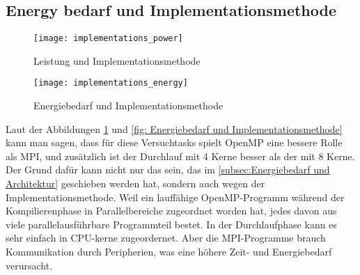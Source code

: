 \subsection{Energy bedarf und Implementationsmethode}
\label{subsec:Energy bedarf und Implementationsmethode}

\begin{figure}[ht]
\texttt{[image: implementations\_power]}
\caption[Leistung und Implementationsmethode]{Leistung und Implementationsmethode}
\label{fig:Leistung und Implementationsmethode}
\end{figure}

\begin{figure}[ht]
\texttt{[image: implementations\_energy]}
\caption[Energiebedarf und Implementationsmethode]{Energiebedarf und Implementationsmethode}
\label{fig:Energiebedarf und Implementationsmethode}
\end{figure}

Laut der Abbildungen \ref{fig:Leistung und Implementationsmethode} und \ref{fig: Energiebedarf und Implementationsmethode} kann man sagen, dass für diese Versuchtasks spielt OpenMP eine bessere Rolle als MPI, und zusätzlich ist der Durchlauf mit 4 Kerne besser als der mit 8 Kerne. Der Grund dafür kann nicht nur das sein, das im \ref{subsec:Energiebedarf und Architektur} geschieben werden hat, sondern auch wegen der Implementationsmethode. Weil ein lauffähige OpenMP-Programm während der Kompilierenphase in Parallelbereiche zugeordnet worden hat, jedes davon aus viele parallelausführbare Programmteil bestet. In der Durchlaufphase kann es sehr einfach in CPU-kerne zugeordernet. Aber die MPI-Programme brauch Kommunikation durch Peripherien, was eine höhere Zeit- und Energiebedarf verursacht.
